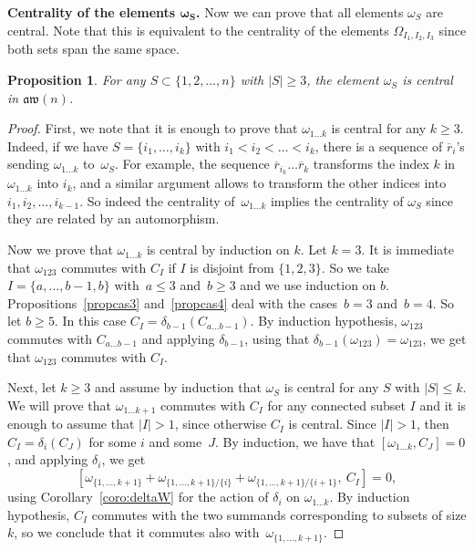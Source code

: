 \documentclass[10pt,a4paper]{amsart}
\numberwithin{equation}{section}
\newtheorem{prop}[theo]{Proposition}
\theoremstyle{definition}
\newcommand{\rb}{\overline{r}}
\newcommand{\aw}{\mathfrak{aw}(n)}
\begin{document}
{\bf Centrality of the elements $\boldsymbol{\omega_S}$.} Now we can prove that all elements $\omega_S$ are central. Note that this is equivalent to the centrality of the elements $\varOmega_{I_1,I_2,I_3}$ since both sets span the same space.
\begin{prop}
 For any $S\subset\{1,2,\dots ,n\}$ with $|S|\geq3$, the element $\omega_{S}$ is central in $\aw$.
\end{prop}
\begin{proof}
First, we note that it is enough to prove that $\omega_{1\dots k}$ is central for any $k\geq 3$. Indeed, if we have $S=\{i_1,\dots,i_k\}$ with $i_1<i_2<\dots <i_k$, there is a sequence of $\rb_i$'s sending $\omega_{1\dots k}$ to~$\omega_S$. For example, the sequence $\rb_{i_k}\dots\rb_{k}$ transforms the index $k$ in $\omega_{1\dots k}$ into $i_k$, and a similar argument allows to transform the other indices into $i_1,i_2,\dots,i_{k-1}$. So indeed the centrality of~$\omega_{1\dots k}$ implies the centrality of $\omega_S$ since they are related by an automorphism.

Now we prove that $\omega_{1\dots k}$ is central by induction on $k$. Let $k=3$. It is immediate that $\omega_{123}$ commutes with $C_I$ if $I$ is disjoint from $\{1,2,3\}$. So we take $I=\{a,\dots, b-1, b\}$ with~$a\leq 3$ and~$b\geq 3$ and we use induction on $b$. Propositions~\ref{propcas3} and~\ref{propcas4} deal with the cases~$b=3$ and~$b=4$. So let $b\geq 5$. In this case $C_I=\delta_{b-1}(C_{a\dots b-1})$. By induction hypothesis, $\omega_{123}$ commutes with $C_{a\dots b-1}$ and applying $\delta_{b-1}$, using that $\delta_{b-1}(\omega_{123})=\omega_{123}$, we get that $\omega_{123}$ commutes with $C_I$.

Next, let $k\geq 3$ and assume by induction that $\omega_S$ is central for any $S$ with $|S|\leq k$. We will prove that $\omega_{1\dots k+1}$ commutes with $C_I$ for any connected subset $I$ and it is enough to assume that $|I|>1$, since otherwise $C_I$ is central. Since $|I|>1$, then $C_I=\delta_i(C_J)$ for some $i$ and some~$J$. By induction, we have that $[\omega_{1\dots k},C_J]=0$, and applying $\delta_i$, we get
\[[\omega_{\{1,\dots, k+1\}}+\omega_{\{1,\dots, k+1\}/\{i\}}+\omega_{\{1,\dots, k+1\}/\{i+1\}} ,\ C_I]=0 ,\]
using Corollary~\ref{coro:deltaW} for the action of $\delta_i$ on $\omega_{1\dots k}$. By induction hypothesis, $C_I$ commutes with the two summands corresponding to subsets of size $k$, so we conclude that it commutes also with~$\omega_{\{1,\dots, k+1\}}$.
\end{proof}
\end{document}
